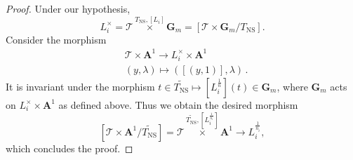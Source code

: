 \documentclass{proc-l}
\newcommand{\Z}{\mathbf{Z}}
\newcommand{\K}{\mathbf{K}}
\newcommand{\G}{\mathbf{G}}
\DeclareMathOperator{\Pic}{Pic}
\DeclareMathOperator{\Ext}{Ext}
\DeclareMathOperator{\NS}{NS}
\DeclareMathOperator{\tor}{tor}
\DeclareMathOperator{\rig}{rig}
\newcommand{\stackT}{\mathcal{T}}
\newcommand{\affine}{\mathbf{A}}
\theoremstyle{definition}
\theoremstyle{remark}
\numberwithin{equation}{section}
\begin{document}
\begin{proof}
Under our hypothesis,
$$
L_i^{\times} = \stackT \overset{T_{\NS},[L_i]} {\times} \G_m
= [\stackT \times \G_m / T_{\NS} ] .
$$
Consider the morphism
\begin{align*}
   &\stackT \times \affine^1 \rightarrow L_i^{\times} \times \affine^1 \\
   &( y , \lambda ) \longmapsto \left( [(y,1)],\lambda \right) \,.
\end{align*}
It is invariant under the morphism $t \in \widetilde{T_{\NS}} \mapsto [L_i^{\frac{1}{n}}](t) \in \G_m$, where $\G_m$ acts on $L_i^{\times} \times \affine^1$ as defined above. Thus we obtain the desired morphism
$$
[\stackT \times \affine^1 / \widetilde{T_{\NS}}]
= \stackT \overset{\widetilde{T_{\NS}},[L_i^{\frac{1}{n_i}}]} {\times} \affine^1
\longrightarrow L_i^{\frac{1}{n_i}},
$$
which concludes the proof.
\end{proof}


%
%
\end{document}
